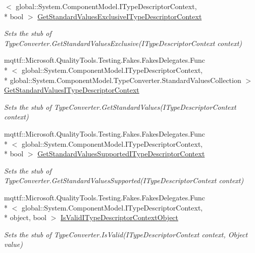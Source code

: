 \begin{DoxyCompactItemize}
$<$ global\-::\-System.\-Component\-Model.\-I\-Type\-Descriptor\-Context, \\*
bool $>$ \hyperlink{class_system_1_1_security_1_1_authentication_1_1_extended_protection_1_1_fakes_1_1_stub_extendedf67afed15bbc0df07bfc91316f6f81f0_a8dcea1ae865a138aca715f122105d305}{Get\-Standard\-Values\-Exclusive\-I\-Type\-Descriptor\-Context}
\begin{DoxyCompactList}\small\item\em Sets the stub of Type\-Converter.\-Get\-Standard\-Values\-Exclusive(\-I\-Type\-Descriptor\-Context context)\end{DoxyCompactList}\item 
mqttf\-::\-Microsoft.\-Quality\-Tools.\-Testing.\-Fakes.\-Fakes\-Delegates.\-Func\\*
$<$ global\-::\-System.\-Component\-Model.\-I\-Type\-Descriptor\-Context, \\*
global\-::\-System.\-Component\-Model.\-Type\-Converter.\-Standard\-Values\-Collection $>$ \hyperlink{class_system_1_1_security_1_1_authentication_1_1_extended_protection_1_1_fakes_1_1_stub_extendedf67afed15bbc0df07bfc91316f6f81f0_aa0af3944071d4d68a9c5d85be384b3b4}{Get\-Standard\-Values\-I\-Type\-Descriptor\-Context}
\begin{DoxyCompactList}\small\item\em Sets the stub of Type\-Converter.\-Get\-Standard\-Values(\-I\-Type\-Descriptor\-Context context)\end{DoxyCompactList}\item 
mqttf\-::\-Microsoft.\-Quality\-Tools.\-Testing.\-Fakes.\-Fakes\-Delegates.\-Func\\*
$<$ global\-::\-System.\-Component\-Model.\-I\-Type\-Descriptor\-Context, \\*
bool $>$ \hyperlink{class_system_1_1_security_1_1_authentication_1_1_extended_protection_1_1_fakes_1_1_stub_extendedf67afed15bbc0df07bfc91316f6f81f0_aa61a24beba88ff6085725203402ab215}{Get\-Standard\-Values\-Supported\-I\-Type\-Descriptor\-Context}
\begin{DoxyCompactList}\small\item\em Sets the stub of Type\-Converter.\-Get\-Standard\-Values\-Supported(\-I\-Type\-Descriptor\-Context context)\end{DoxyCompactList}\item 
mqttf\-::\-Microsoft.\-Quality\-Tools.\-Testing.\-Fakes.\-Fakes\-Delegates.\-Func\\*
$<$ global\-::\-System.\-Component\-Model.\-I\-Type\-Descriptor\-Context, \\*
object, bool $>$ \hyperlink{class_system_1_1_security_1_1_authentication_1_1_extended_protection_1_1_fakes_1_1_stub_extendedf67afed15bbc0df07bfc91316f6f81f0_a965e48d92fa9ea9e5d95497b3fc9ec8e}{Is\-Valid\-I\-Type\-Descriptor\-Context\-Object}
\begin{DoxyCompactList}\small\item\em Sets the stub of Type\-Converter.\-Is\-Valid(\-I\-Type\-Descriptor\-Context context, Object value)\end{DoxyCompactList}\end{DoxyCompactItemize}

